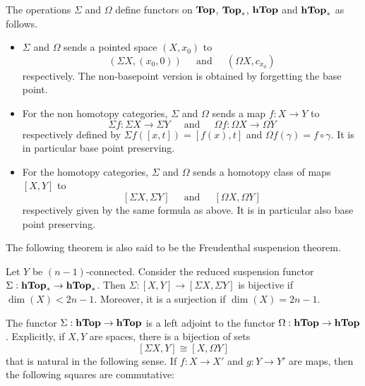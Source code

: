 \documentclass[a4paper]{article}
\begin{document}
\begin{thm}{}{} The operations $\Sigma$ and $\Omega$ define functors on $\bold{Top}$, $\bold{Top}_\ast$, $\bold{hTop}$ and $\bold{hTop}_\ast$ as follows. 
\begin{itemize}
\item $\Sigma$ and $\Omega$ sends a pointed space $(X,x_0)$ to $$(\Sigma X,(x_0,0))\;\;\;\;\text{ and }\;\;\;\;(\Omega X,c_{x_0})$$ respectively. The non-basepoint version is obtained by forgetting the base point. 
\item For the non homotopy categories, $\Sigma$ and $\Omega$ sends a map $f:X\to Y$ to $$\Sigma f:\Sigma X\to\Sigma Y\;\;\;\;\text{ and }\;\;\;\;\Omega f:\Omega X\to\Omega Y$$ respectively defined by $\Sigma f([x,t])=[f(x),t]$ and $\Omega f(\gamma)=f\circ\gamma$. It is in particular base point preserving. 
\item For the homotopy categories, $\Sigma$ and $\Omega$ sends a homotopy class of maps $[X,Y]$ to $$[\Sigma X,\Sigma Y]\;\;\;\;\text{ and }\;\;\;\;[\Omega X,\Omega Y]$$ respectively given by the same formula as above. It is in particular also base point preserving. 
\end{itemize}
\end{thm}

The following theorem is also said to be the Freudenthal suspension theorem. 

\begin{thm}{}{} Let $Y$ be $(n-1)$-connected. Consider the reduced suspension functor $\Sigma:\bold{hTop}_\ast\to\bold{hTop}_\ast$. Then $\Sigma:[X,Y]\to[\Sigma X,\Sigma Y]$ is bijective if $\dim(X)<2n-1$. Moreover, it is a surjection if $\dim(X)=2n-1$. 
\end{thm}

\begin{thm}{}{} The functor $\Sigma:\bold{hTop}\to\bold{hTop}$ is a left adjoint to the functor $\Omega:\bold{hTop}\to\bold{hTop}$. Explicitly, if $X,Y$ are spaces, there is a bijection of sets $$[\Sigma X,Y]\cong[X,\Omega Y]$$ that is natural in the following sense. If $f:X\to X'$ and $g:Y\to Y'$ are maps, then the following squares are commutative: \\~\\
\\~\\
\end{thm}
\end{document}
